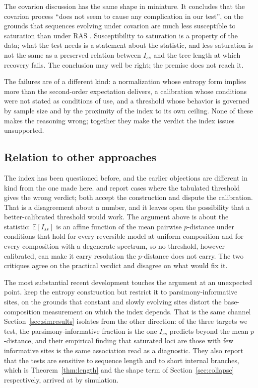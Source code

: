\documentclass[preprint,12pt,authoryear]{elsarticle}
\newcommand{\Iss}{I_{ss}}
\newcommand{\E}{\mathbb{E}}
\theoremstyle{definition}
\theoremstyle{remark}
\begin{document}
The covarion discussion has the same shape in miniature. It concludes that the
covarion process ``does not seem to cause any complication in our test'', on the
grounds that sequences evolving under covarion are much less susceptible to
saturation than under RAS \citep{penny2001mathematical}. Susceptibility to
saturation is a property of the data; what the test needs is a statement about
the statistic, and less saturation is not the same as a preserved relation
between $\Iss$ and the tree length at which recovery fails. The conclusion may
well be right; the premise does not reach it.

The failures are of a different kind: a normalization whose entropy form
implies more than the second-order expectation delivers, a calibration whose
conditions were not stated as conditions of use, and a threshold whose
behavior is governed by sample size and by the proximity of the index to its
own ceiling. None of these makes the reasoning wrong; together they make the
verdict the index issues unsupported.

\subsection{Relation to other approaches}
\label{sec:related}

The index has been questioned before, and the earlier objections are
different in kind from the one made here. \citet{verbruggen2007codium} and
\citet{letsch2011rrna} report cases where the tabulated threshold gives the
wrong verdict; both accept the construction and dispute the calibration.
That is a disagreement about a number, and it leaves open the possibility that
a better-calibrated threshold would work. The argument above is about the
statistic: $\E[\Iss]$ is an affine function of the mean pairwise $p$-distance
under conditions that hold for every reversible model at uniform composition
and for every composition with a degenerate spectrum, so no threshold, however
calibrated, can make it carry resolution the $p$-distance does not carry. The
two critiques agree on the practical verdict and disagree on what would fix
it.

The most substantial recent development touches the argument at an
unexpected point. \citet{duchene2022saturation} keep the entropy construction
but restrict it to parsimony-informative sites, on the grounds that constant
and slowly evolving sites distort the base-composition measurement on which
the index depends. That is the same channel Section~\ref{sec:simresults}
isolates from the other direction: of the three targets we test, the
parsimony-informative fraction is the one $\Iss$ predicts beyond the mean
$p$-distance, and their empirical finding that saturated loci are those with
few informative sites is the same association read as a diagnostic. They also
report that the tests are sensitive to sequence length and to short internal
branches, which is Theorem~\ref{thm:length} and the shape term of
Section~\ref{sec:collapse} respectively, arrived at by simulation.
\end{document}
